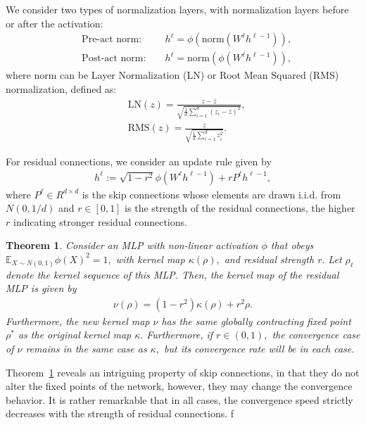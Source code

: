 \documentclass[twoside]{article}
\newcommand{\E}{\mathbb{E}}
\newtheorem{theorem}{Theorem}
\theoremstyle{definition}
\begin{document}
We consider two types of normalization layers, with normalization layers before or after the activation: 
\begin{align*}
    & \text{Pre-act norm: } &&h^\ell = \phi\left(\text{norm}\left(W^\ell h^{\ell-1}\right)\right), \\
    & \text{Post-act norm: } &&h^\ell = \text{norm}\left(\phi\left(W^\ell h^{\ell-1}\right)\right), 
\end{align*}
where $\text{norm}$ can be Layer Normalization (LN) or Root Mean Squared (RMS) normalization, defined as:
\begin{align*}
    &\text{LN}(z) = \frac{z - \bar{z}}{\sqrt{\frac1d \sum_{i=1}^d (z_i - \bar{z})^2}}, \\
    &\text{RMS}(z) = \frac{z}{\sqrt{\frac1d \sum_{i=1}^d z_i^2}}.
\end{align*}

For residual connections, we consider an update rule given by 
\begin{align*}
    h^\ell := \sqrt{1-r^2} \phi(W^\ell h^{\ell-1}) + r P^{\ell} h^{\ell-1}, 
\end{align*}
where $P^{\ell}\in R^{d\times d}$ is the skip connections whose elements are drawn i.i.d. from $N(0,1/d)$ and $r\in [0,1]$ is the strength of the residual connections, the higher $r$ indicating stronger residual connections.   

\begin{theorem}
\label{thm:global_attract_res}
Consider an MLP with non-linear activation $\phi$ that obeys $\E_{X\sim N(0,1)} \phi(X)^2 = 1,$  with kernel map $\kappa(\rho),$ and residual strength $r.$ Let $\rho_\ell$ denote the kernel sequence of this MLP. Then, the kernel map of the residual MLP is given by 
\begin{align*}
    \nu(\rho) = (1-r^2) \kappa(\rho) + r^2 \rho.
\end{align*}
Furthermore, the new kernel map $\nu$ has the same globally contracting fixed point $\rho^*$ as the original kernel map $\kappa.$ Furthermore, if $r\in(0,1),$ the convergence case of $\nu$ remains in the same case  as $\kappa,$ but its convergence rate will be in each case. 
\end{theorem}

Theorem~\ref{thm:global_attract_res} reveals an intriguing property of skip connections, in that they do not alter the fixed points of the network, however, they may change the convergence behavior. It is rather remarkable that in all cases, the convergence speed strictly decreases with the strength of residual connections. f
\end{document}
